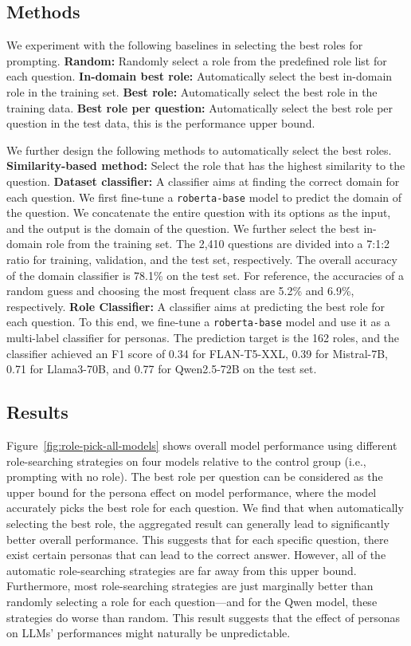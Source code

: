 \documentclass[11pt]{article}
\begin{document}
\subsection{Methods}
We experiment with the following baselines in selecting the best roles for prompting.
\textbf{Random:} Randomly select a role from the predefined role list for each question. 
\textbf{In-domain best role:} Automatically select the best in-domain role in the training set. 
\textbf{Best role:} Automatically select the best role in the training data. 
\textbf{Best role per question:} Automatically select the best role per question in the test data, this is the performance upper bound. 


We further design the following methods to automatically select the best roles. \textbf{Similarity-based method:} Select the role that has the highest similarity to the question. \textbf{Dataset classifier: } A classifier aims at finding the correct domain for each question. We first fine-tune a \texttt{roberta-base} model to predict the domain of the question. We concatenate the entire question with its options as the input, and the output is the domain of the question. We further select the best in-domain role from the training set. The 2,410 questions are divided into a 7:1:2 ratio for training, validation, and the test set, respectively. The overall accuracy of the domain classifier is 78.1\% on the test set. For reference, the accuracies of a random guess and choosing the most frequent class are 5.2\% and 6.9\%, respectively. \textbf{Role Classifier:} A classifier aims at predicting the best role for each question. To this end, we fine-tune a \texttt{roberta-base} model and use it as a multi-label classifier for personas. The prediction target is the 162 roles, and the classifier achieved an F1 score of 0.34 for FLAN-T5-XXL, 0.39 for Mistral-7B, 0.71 for Llama3-70B, and 0.77 for Qwen2.5-72B on the test set. 


\subsection{Results}

Figure~\ref{fig:role-pick-all-models} shows overall model performance using different role-searching strategies on four models relative to the control group (i.e., prompting with no role). The best role per question can be considered as the upper bound for the persona effect on model performance, where the model accurately picks the best role for each question. We find that when automatically selecting the best role, the aggregated result can generally lead to significantly better overall performance. This suggests that for each specific question, there exist certain personas that can lead to the correct answer. 
However, all of the automatic role-searching strategies are far away from this upper bound. Furthermore, most role-searching strategies are just marginally better than randomly selecting a role for each question---and for the Qwen model, these strategies do worse than random.  This result suggests that the effect of personas on LLMs' performances might naturally be unpredictable.
\end{document}
